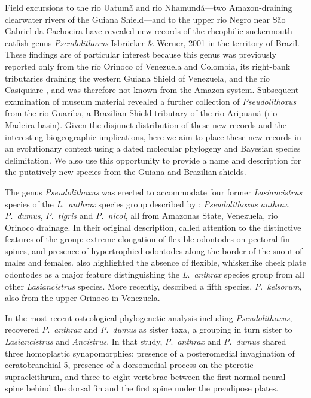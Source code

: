 \documentclass[12pt]{article}
\begin{document}
Field excursions to the rio Uatumã and rio Nhamundá---two Amazon-draining clearwater rivers of the Guiana Shield---and to the upper rio Negro near São Gabriel da Cachoeira have revealed new records of the rheophilic suckermouth-catfish genus \emph{Pseudolithoxus} Isbrücker \& Werner, 2001 in the territory of Brazil. %
These findings are of particular interest because this genus was previously reported only from the río Orinoco of Venezuela and Colombia, its right-bank tributaries draining the western Guiana Shield of Venezuela, and the río Casiquiare \citep{Armbruster2000,Lujan2011kelsorum}, and was therefore not known from the Amazon system. %
Subsequent examination of museum material revealed a further collection of \emph{Pseudolithoxus} from the rio Guariba, a Brazilian Shield tributary of the rio Aripuanã (rio Madeira basin). %
Given the disjunct distribution of these new records and the interesting biogeographic implications, here we aim to place these new records in an evolutionary context using a dated molecular phylogeny and Bayesian species delimitation. %
We also use this opportunity to provide a name and description for the putatively new species from the Guiana and Brazilian shields.

The genus \emph{Pseudolithoxus} was erected to accommodate four former \emph{Lasiancistrus} species of the \emph{L}.\ \emph{anthrax} species group described by \citet{Armbruster2000}: \emph{Pseudolithoxus anthrax}, \emph{P}.\ \emph{dumus}, \emph{P}.\ \emph{tigris} and \emph{P}.\ \emph{nicoi}, all from Amazonas State, Venezuela, río Orinoco drainage. %
In their original description, \citet{Armbruster2000} called attention to the distinctive features of the group: extreme elongation of flexible odontodes on pectoral-fin spines, and presence of hypertrophied odontodes along the border of the snout of males and females. %
\citet{Armbruster2000} also highlighted the absence of flexible, whiskerlike cheek plate odontodes as a major feature distinguishing the \emph{L}.\ \emph{anthrax} species group from all other \emph{Lasiancistrus} species. %
More recently, \citet{Lujan2011kelsorum} described a fifth species, \emph{P}.\ \emph{kelsorum}, also from the upper Orinoco in Venezuela.%

In the most recent osteological phylogenetic analysis including \emph{Pseudolithoxus}, \citet{Armbruster2008} recovered \emph{P}.\ \emph{anthrax} and \emph{P}.\ \emph{dumus} as sister taxa, a grouping in turn sister to \emph{Lasiancistrus} and \emph{Ancistrus}. %
In that study, \emph{P}.\ \emph{anthrax} and \emph{P}.\ \emph{dumus} shared three homoplastic synapomorphies: presence of a posteromedial invagination of ceratobranchial 5, presence of a dorsomedial process on the pterotic-supracleithrum, and three to eight vertebrae between the first normal neural spine behind the dorsal fin and the first spine under the preadipose plates.%
\end{document}
